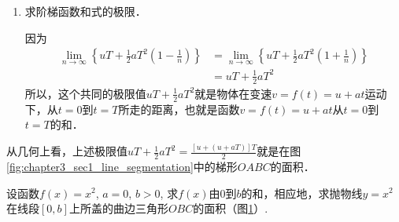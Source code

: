 \begin{solution}
\begin{enumerate}
\begin{align*}
    \text{$G_n(t)$从0到$T$的和}&=f(t_1)(t_1-t_0)+f(t_2)(t_2-t_1)+\cdots+f(t_n)(t_n-t_{n-1})  \\
   &= \left[f(t_1)+f(t_2)+\cdots+f(t_{n})\right]\cdot \frac{T}{n}\\
    &=\left[(u+at_1)+(u+at_2)+\cdots +(u+at_{n})\right]\cdot \frac{T}{n}\\
    &=\left[nu+a\left(\frac{T}{n}+\frac{2T}{n}+\cdots+\frac{nT}{n}\right)\right]\cdot \frac{T}{n}\\
    &=uT+a\cdot (1+2+\cdots+n)\cdot \left(\frac{T}{n}\right)^2\\
    &=uT+\frac{1}{2}aT^2\left(1+\frac{1}{n}\right)
    \end{align*}
综合上述计算和基本性质1, 即得：$g_n(t)$从0到$T$的和$\le f(t)$从0到$T$的和$\le G_n(t)$从0到$T$的
和，即
\[uT+\frac{1}{2}aT^2\left(1-\frac{1}{n}\right)\le f(t)
\text{从0到$T$的和}\le uT+\frac{1}{2}aT^2\left(1+\frac{1}{n}\right)\]

\item 求阶梯函数和式的极限．

因为
\begin{align*}
    \lim_{n\to\infty}\left\{uT+\frac{1}{2}aT^2\left(1-\frac{1}{n}\right)\right\}&=\lim_{n\to\infty}\left\{uT+\frac{1}{2}aT^2\left(1+\frac{1}{n}\right)\right\}\\
    &=uT+\frac{1}{2}aT^2
\end{align*}
所以，这个共同的极限值$uT+\frac{1}{2}aT^2$就是物体在变速$v=f(t)=u+at$运动下，从$t=0$到$t=T$所走的距离，也就是函数$v=f(t)=u+at$从$t=0$到$t=T$的和．
\end{enumerate}

从几何上看，上述极限值$uT+\frac{1}{2}aT^2=\frac{[u+(u+aT)]T}{2}$就是在图\ref{fig:chapter3_sec1_line_segmentation}中的梯形$OABC$的面积．
\end{solution}    

\begin{example}
    设函数$f(x)=x^2$, $a=0$, $b>0$, 求$f(x)$由0到$b$的和，相应地，求抛物线$y=x^2$在线段$[0,b]$上所盖的曲边三角形$OBC$的面积（图\ref{fig:chapter3_sec1_y=x^2}）.
\end{example}

\begin{figure}[htp]
    \centering
{}
    \caption{}\label{fig:chapter3_sec1_y=x^2}
\end{figure}

